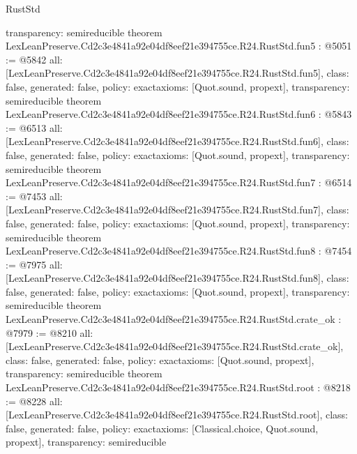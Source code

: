 \begin{lexlean}{RustStd}
\begin{coremodule}
{  transparency: semireducible
}
theorem LexLeanPreserve.Cd2c3e4841a92e04df8eef21e394755ce.R24.RustStd.fun5 : @5051 := @5842 {
  all: [LexLeanPreserve.Cd2c3e4841a92e04df8eef21e394755ce.R24.RustStd.fun5],
  class: false,
  generated: false,
  policy: exact{axioms: [Quot.sound, propext]},
  transparency: semireducible
}
theorem LexLeanPreserve.Cd2c3e4841a92e04df8eef21e394755ce.R24.RustStd.fun6 : @5843 := @6513 {
  all: [LexLeanPreserve.Cd2c3e4841a92e04df8eef21e394755ce.R24.RustStd.fun6],
  class: false,
  generated: false,
  policy: exact{axioms: [Quot.sound, propext]},
  transparency: semireducible
}
theorem LexLeanPreserve.Cd2c3e4841a92e04df8eef21e394755ce.R24.RustStd.fun7 : @6514 := @7453 {
  all: [LexLeanPreserve.Cd2c3e4841a92e04df8eef21e394755ce.R24.RustStd.fun7],
  class: false,
  generated: false,
  policy: exact{axioms: [Quot.sound, propext]},
  transparency: semireducible
}
theorem LexLeanPreserve.Cd2c3e4841a92e04df8eef21e394755ce.R24.RustStd.fun8 : @7454 := @7975 {
  all: [LexLeanPreserve.Cd2c3e4841a92e04df8eef21e394755ce.R24.RustStd.fun8],
  class: false,
  generated: false,
  policy: exact{axioms: [Quot.sound, propext]},
  transparency: semireducible
}
theorem LexLeanPreserve.Cd2c3e4841a92e04df8eef21e394755ce.R24.RustStd.crate_ok : @7979 := @8210 {
  all: [LexLeanPreserve.Cd2c3e4841a92e04df8eef21e394755ce.R24.RustStd.crate_ok],
  class: false,
  generated: false,
  policy: exact{axioms: [Quot.sound, propext]},
  transparency: semireducible
}
theorem LexLeanPreserve.Cd2c3e4841a92e04df8eef21e394755ce.R24.RustStd.root : @8218 := @8228 {
  all: [LexLeanPreserve.Cd2c3e4841a92e04df8eef21e394755ce.R24.RustStd.root],
  class: false,
  generated: false,
  policy: exact{axioms: [Classical.choice, Quot.sound, propext]},
  transparency: semireducible
}


\end{coremodule}
\end{lexlean}
